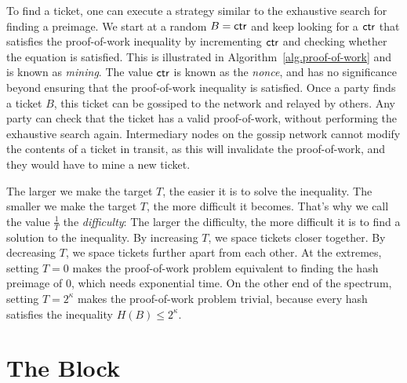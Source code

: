 To find a ticket, one can execute a strategy similar to the exhaustive search for finding a
preimage. We start at a random $B = \mathsf{ctr}$ and keep looking for a $\mathsf{ctr}$ that satisfies the
proof-of-work inequality by incrementing $\mathsf{ctr}$ and checking whether the equation is satisfied.
This is illustrated in Algorithm~\ref{alg.proof-of-work} and is known
as \emph{mining}. The value $\mathsf{ctr}$ is known as the
\emph{nonce},
and has no significance beyond ensuring that the proof-of-work inequality is satisfied.
Once a party finds a ticket $B$, this ticket can be gossiped
to the network and relayed by others. Any party can check that the ticket has a valid proof-of-work,
without performing the exhaustive search again. Intermediary nodes on the gossip network cannot
modify the contents of a ticket in transit, as this will invalidate the proof-of-work, and they
would have to mine a new ticket.

The larger we make the target $T$, the easier it is to solve the inequality. The smaller we make
the target $T$, the more difficult it becomes. That's why we call the value $\frac{1}{T}$ the
\emph{difficulty}: The larger the difficulty, the more difficult it is to
find a solution to the inequality. By increasing $T$, we space tickets closer together.
By decreasing $T$, we space tickets further apart from each other. At the extremes,
setting $T = 0$ makes the proof-of-work problem equivalent to finding the hash preimage of
$0$, which needs exponential time. On the other end of the spectrum, setting $T = 2^\kappa$
makes the proof-of-work problem trivial, because every hash satisfies the inequality
$H(B) \leq 2^\kappa$.

\section{The Block}

